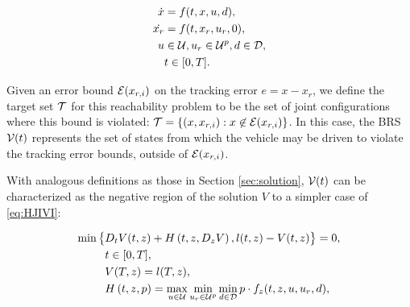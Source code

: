 \begin{equation}
\label{eq:jdyn} %
\begin{aligned}
\dot{x} &= f(t, x, u, d), \\
\dot{x_r} &=f(t,x_r,u_r,0),\\
u &\in \cset, u_r\in\cset^p, d \in \dset, \\
&t \in [0, T].
\end{aligned}
\end{equation}

Given an error bound $\mathcal{E}(x_{r,i})$ on the tracking error $e=x-x_r$, we define the target set $\mathcal{T}$ for this reachability problem to be the set of joint configurations where this bound is violated: $\mathcal{T} = \{(x, x_{r,i}): x\not\in\mathcal{E}(x_{r,i})\}$. In this case, the BRS $\mathcal{V}(t)$ represents the set of states from which the vehicle may be driven to violate the tracking error bounds, outside of $\mathcal{E}(x_{r,i})$.




With analogous definitions as those in Section \ref{sec:solution}, $\mathcal{V}(t)$ can be characterized as the negative region of the solution $V$ to a simpler case of \eqref{eq:HJIVI}:

\begin{equation}
\label{eq:HJIVI_track}
\begin{aligned}
\min\big\{&D_t V(t, z) + H\left(t, z, D_z V\right), l(t,z) - V(t, z)\big\}= 0,\\&  t\in[0,T],\\
&V(T, z) = l(T, z),\\
&H\left(t, z, p\right) = \max_{u \in \mathcal{U}} \min_{u_r \in\mathcal{U}^p} \min_{d \in \mathcal{D}} p \cdot f_z(t,z,u,u_r,d),
\end{aligned}
\end{equation}

